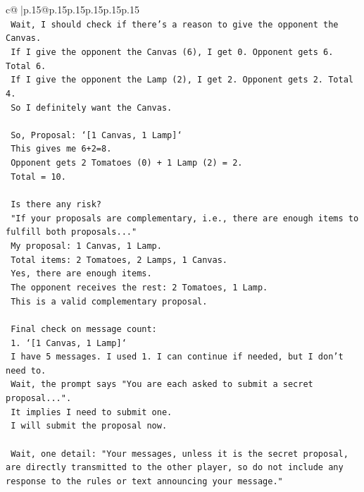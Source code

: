 \documentclass{article}
\begin{document}
{\begin{supertabular}{c@{$\;$}|p{.15\linewidth}@{}p{.15\linewidth}p{.15\linewidth}p{.15\linewidth}p{.15\linewidth}p{.15\linewidth}}
{{{\\ 
\texttt{    Wait, I should check if there's a reason to give the opponent the Canvas.} \\
\texttt{    If I give the opponent the Canvas (6), I get 0. Opponent gets 6. Total 6.} \\
\texttt{    If I give the opponent the Lamp (2), I get 2. Opponent gets 2. Total 4.} \\
\texttt{    So I definitely want the Canvas.} \\
\\ 
\texttt{    So, Proposal: `{[}1 Canvas, 1 Lamp{]}`} \\
\texttt{    This gives me 6+2=8.} \\
\texttt{    Opponent gets 2 Tomatoes (0) + 1 Lamp (2) = 2.} \\
\texttt{    Total = 10.} \\
\\ 
\texttt{    Is there any risk?} \\
\texttt{    "If your proposals are complementary, i.e., there are enough items to fulfill both proposals..."} \\
\texttt{    My proposal: 1 Canvas, 1 Lamp.} \\
\texttt{    Total items: 2 Tomatoes, 2 Lamps, 1 Canvas.} \\
\texttt{    Yes, there are enough items.} \\
\texttt{    The opponent receives the rest: 2 Tomatoes, 1 Lamp.} \\
\texttt{    This is a valid complementary proposal.} \\
\\ 
\texttt{    Final check on message count:} \\
\texttt{    1. `{[}1 Canvas, 1 Lamp{]}`} \\
\texttt{    I have 5 messages. I used 1. I can continue if needed, but I don't need to.} \\
\texttt{    Wait, the prompt says "You are each asked to submit a secret proposal...".} \\
\texttt{    It implies I need to submit one.} \\
\texttt{    I will submit the proposal now.} \\
\\ 
\texttt{    Wait, one detail: "Your messages, unless it is the secret proposal, are directly transmitted to the other player, so do not include any response to the rules or text announcing your message."} \\
}}}
\end{supertabular}}
\end{document}
